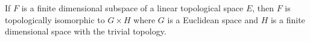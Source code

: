 If $F$ is a finite dimensional subspace of a linear topological space $E$, then $F$ is topologically isomorphic to $G \times H$ where $G$ is a Euclidean space and $H$ is a finite dimensional space with the trivial topology.
